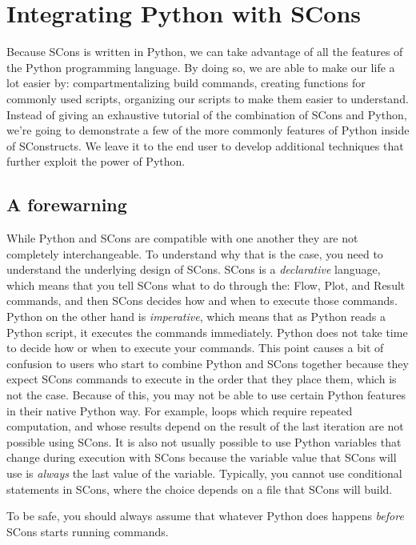 \section{Integrating Python with SCons}

Because SCons is written in Python, we can take advantage of all the features of the Python programming language.  By doing so, we are able to make our life a lot easier by: compartmentalizing build commands, creating functions for commonly used scripts, organizing our scripts to make them easier to understand.  Instead of giving an exhaustive tutorial of the combination of SCons and Python, we're going to demonstrate a few of the more commonly features of Python inside of SConstructs.  We leave it to the end user to develop additional techniques that further exploit the power of Python.

\subsection{A forewarning}

While Python and SCons are compatible with one another they are not completely interchangeable.  To understand why that is the case, you need to understand the underlying design of SCons. SCons is a \emph{declarative} language, which means that you tell SCons what to do through the: Flow, Plot, and Result commands, and then SCons decides how and when to execute those commands.  Python on the other hand is \emph{imperative}, which means that as Python reads a Python script, it executes the commands immediately.  Python does not take time to decide how or when to execute your commands.  This point causes a bit of confusion to users who start to combine Python and SCons together because they expect SCons commands to execute in the order that they place them, which is not the case.  Because of this, you may not be able to use certain Python features in their native Python way.  For example, loops which require repeated computation, and whose results depend on the result of the last iteration are not possible using SCons.  It is also not usually possible to use Python variables that change during execution with SCons because the variable value that SCons will use is \emph{always} the last value of the variable.  Typically, you cannot use conditional statements in SCons, where the choice depends on a file that SCons will build.  

To be safe, you should always assume that whatever Python does happens \emph{before} SCons starts running commands.

